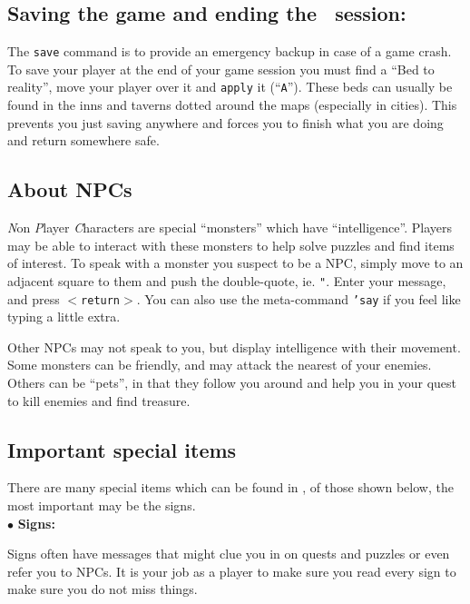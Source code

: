 \subsection{Saving the game and ending the \cf\ session:}

The {\tt save} command is to provide an emergency backup in case of a game crash.
To save your player at the end of your game session you must find a ``Bed to
reality'', move your player over it and
{\tt apply} it (``{\tt A}''). These beds can usually be
found in the inns and
taverns dotted around the maps (especially in cities). This prevents you
just saving anywhere and forces you to finish what you are doing and return
somewhere safe.

\subsection{About NPCs}
{\em N}on {\em P}layer {\em C}haracters are special
``monsters'' which have ``intelligence''. Players
may be able to interact with these monsters to help solve puzzles and find
items of interest. To speak with a monster you suspect to be a NPC, simply
move to an adjacent square to them and push the double-quote, ie. {\tt "}. Enter
your message, and press {\tt $<$return$>$}. You can also use the meta-command
{\tt 'say} if you feel like typing a little extra.

Other NPCs may not speak to you, but display intelligence with their
movement. Some monsters can be friendly, and may attack the nearest of your
enemies. Others can be ``pets'', in that they follow you around and help you
in your quest to kill enemies and find treasure.


\subsection{Important special items}

There are many special items which can be found in \cf , of those shown
below, the most important may be the signs. \\

$\bullet$ {\bf Signs:}

Signs often have messages that might clue you in on quests and puzzles
or even refer you to NPCs. It is your job as a player to make sure you
read every sign to make sure you do not miss things. \\

